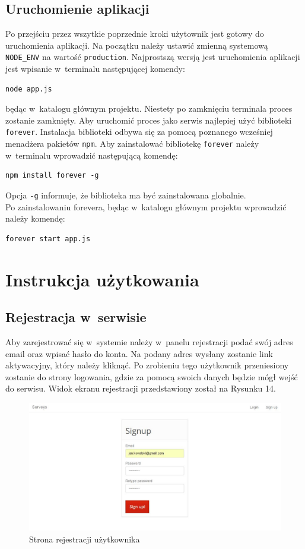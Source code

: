 \documentclass[8pt,a4paper,notitlepage]{article}
\begin{document}
\subsection{Uruchomienie aplikacji}
Po przejściu przez wszytkie poprzednie kroki użytownik jest gotowy do uruchomienia aplikacji. Na początku należy ustawić zmienną systemową \texttt{NODE\_ENV} na wartość \texttt{production}. Najprostszą wersją jest uruchomienia aplikacji jest wpisanie w~terminalu następującej komendy:
\begin{lstlisting}
node app.js
\end{lstlisting}
będąc w~katalogu głównym projektu. Niestety po zamknięciu terminala proces zostanie zamknięty. Aby uruchomić proces jako serwis najlepiej użyć biblioteki \texttt{forever}. Instalacja biblioteki odbywa się za pomocą poznanego wcześniej menadżera pakietów \texttt{npm}. Aby zainstalować bibliotekę \texttt{forever} należy w~terminalu wprowadzić następującą komendę:
\begin{lstlisting}
npm install forever -g
\end{lstlisting}
Opcja \texttt{-g} informuje, że biblioteka ma być zainstalowana globalnie. 
\\
Po zainstalowaniu forevera, będąc w~katalogu głównym projektu wprowadzić należy komendę:
\begin{lstlisting}
forever start app.js
\end{lstlisting}

\newpage
\section{Instrukcja użytkowania}
\subsection{Rejestracja w~serwisie}
Aby zarejestrować się w~systemie należy w~panelu rejestracji podać swój adres email oraz wpisać hasło do konta. Na podany adres wysłany zostanie link aktywacyjny, który należy kliknąć. Po zrobieniu tego użytkownik przeniesiony zostanie do strony logowania, gdzie za pomocą swoich danych będzie mógł wejść do serwisu. Widok ekranu rejestracji przedstawiony został na Rysunku 14.

\begin{figure}[H]
    \centering
    \includegraphics[width=\linewidth]{obrazy/register}
    \caption{Strona rejestracji użytkownika}
\end{figure} 
\end{document}
